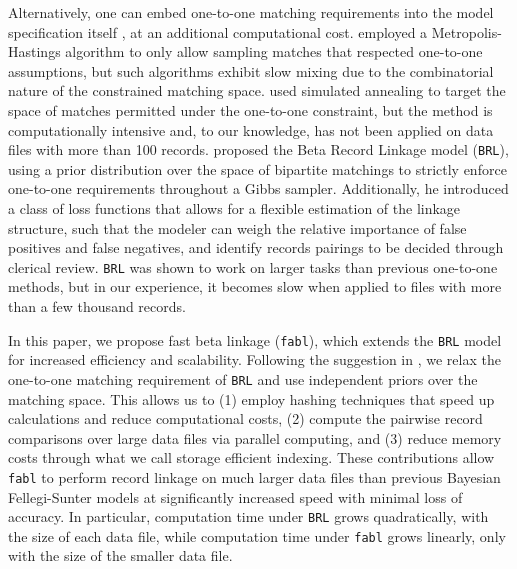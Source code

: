 \documentclass[ba]{imsart}
\begin{document}
Alternatively, one can embed one-to-one matching requirements into the model specification itself \citep{gutman2013bayesian, liseo_2011}, at an additional computational cost. \cite{Larsen05} employed a Metropolis-Hastings algorithm to only allow sampling matches that respected one-to-one assumptions, but such algorithms exhibit slow mixing due to the combinatorial nature of the constrained matching space. \cite{fortunato_2010} used simulated annealing to target the space of matches permitted under the one-to-one constraint, but the method is computationally intensive and, to our knowledge, has not been applied on data files with more than 100 records. \cite{sadinle_bayesian_2017} proposed the Beta Record Linkage model (\texttt{BRL}), using a prior distribution over the space of bipartite matchings to strictly enforce one-to-one requirements throughout a Gibbs sampler. Additionally, he introduced a class of loss functions that allows for a flexible estimation of the linkage structure, such that the modeler can weigh the relative importance of false positives and false negatives, and identify records pairings to be decided through clerical review. \texttt{BRL} was shown to work on larger tasks than previous one-to-one methods, but in our experience, it becomes slow when applied to files with more than a few thousand records. 

In this paper, we propose fast beta linkage (\texttt{fabl}), which extends the \texttt{BRL} model for increased efficiency and scalability. Following the suggestion in \cite{wortman2019}, we relax the one-to-one matching requirement of \texttt{BRL} and use independent priors over the matching space. This allows us to (1) employ hashing techniques that speed up calculations and reduce computational costs, (2) compute the pairwise record comparisons over large data files via parallel computing, and (3) reduce memory costs through what we call storage efficient indexing. These contributions allow \texttt{fabl} to perform record linkage on much larger data files than previous Bayesian Fellegi-Sunter models at significantly increased speed with minimal loss of accuracy. In particular, computation time under \texttt{BRL} grows quadratically, with the size of each data file, while computation time under \texttt{fabl} grows linearly, only with the size of the smaller data file.

\end{document}
